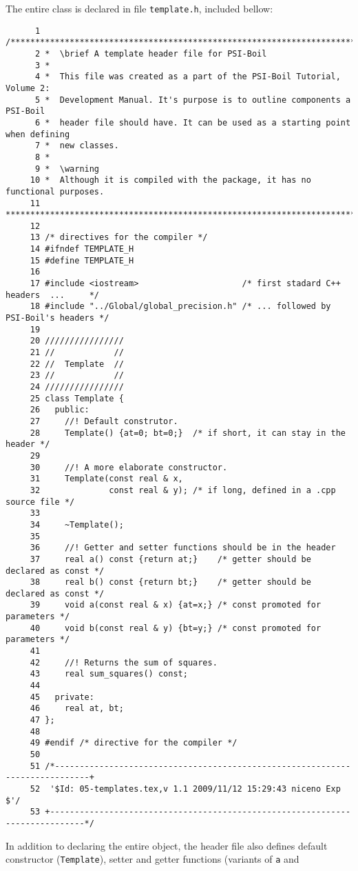 The entire class is declared in file {\tt template.h}, included bellow:
%
{\small \begin{verbatim}
      1 /***************************************************************************//**
      2 *  \brief A template header file for PSI-Boil
      3 *
      4 *  This file was created as a part of the PSI-Boil Tutorial, Volume 2:
      5 *  Development Manual. It's purpose is to outline components a PSI-Boil
      6 *  header file should have. It can be used as a starting point when defining
      7 *  new classes.
      8 *
      9 *  \warning
     10 *  Although it is compiled with the package, it has no functional purposes.
     11 *******************************************************************************/
     12
     13 /* directives for the compiler */
     14 #ifndef TEMPLATE_H
     15 #define TEMPLATE_H
     16
     17 #include <iostream>                     /* first stadard C++ headers  ...     */
     18 #include "../Global/global_precision.h" /* ... followed by PSI-Boil's headers */
     19
     20 ////////////////
     21 //            //
     22 //  Template  //
     23 //            //
     24 ////////////////
     25 class Template {
     26   public:
     27     //! Default construtor.
     28     Template() {at=0; bt=0;}  /* if short, it can stay in the header */
     29
     30     //! A more elaborate constructor.
     31     Template(const real & x,
     32              const real & y); /* if long, defined in a .cpp source file */
     33
     34     ~Template();
     35
     36     //! Getter and setter functions should be in the header
     37     real a() const {return at;}    /* getter should be declared as const */
     38     real b() const {return bt;}    /* getter should be declared as const */
     39     void a(const real & x) {at=x;} /* const promoted for parameters */
     40     void b(const real & y) {bt=y;} /* const promoted for parameters */
     41
     42     //! Returns the sum of squares.
     43     real sum_squares() const;
     44
     45   private:
     46     real at, bt;
     47 };
     48
     49 #endif /* directive for the compiler */
     50
     51 /*-----------------------------------------------------------------------------+
     52  '$Id: 05-templates.tex,v 1.1 2009/11/12 15:29:43 niceno Exp $'/
     53 +-----------------------------------------------------------------------------*/
\end{verbatim}}
% 
In addition to declaring the entire object, the header file also defines default 
constructor ({\tt Template}), setter and getter functions (variants of {\tt a} and 
